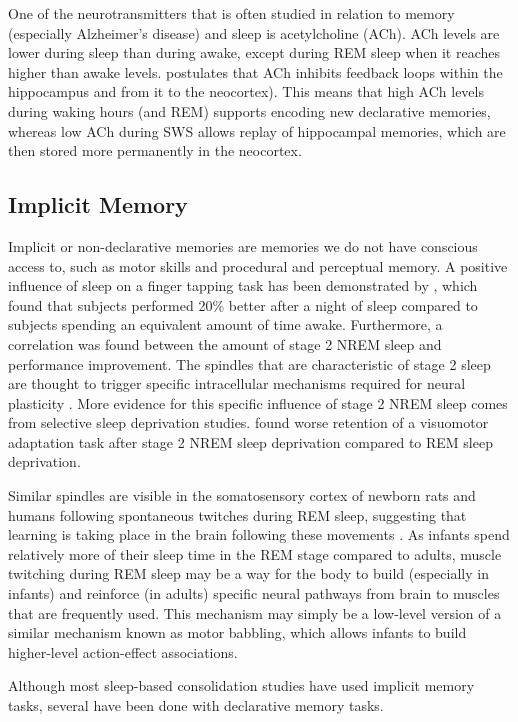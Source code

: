 \documentclass[10pt,letterpaper]{article}
\begin{document}
One of the neurotransmitters that is often studied in relation to memory (especially Alzheimer's disease) and sleep is acetylcholine (ACh). ACh levels are lower during sleep than during awake, except during REM sleep when it reaches higher than awake levels.  postulates that ACh inhibits feedback loops within the hippocampus and from it to the neocortex). This means that high ACh levels during waking hours (and REM) supports encoding new declarative memories, whereas low ACh during SWS allows replay of hippocampal memories, which are then stored more permanently in the neocortex.


\subsection{Implicit Memory}

Implicit or non-declarative memories are memories we do not have conscious access to, such as motor skills and procedural and perceptual memory. A positive influence of sleep on a finger tapping task has been demonstrated by , which found that subjects performed 20\% better after a night of sleep compared to subjects spending an equivalent amount of time awake. Furthermore, a correlation was found between the amount of stage 2 NREM sleep and performance improvement. The spindles that are characteristic of stage 2 sleep are thought to trigger specific intracellular mechanisms required for neural plasticity \cite{Walker:2006}. More evidence for this specific influence of stage 2 NREM sleep comes from selective sleep deprivation studies.  found worse retention of a visuomotor adaptation task after stage 2 NREM sleep deprivation compared to REM sleep deprivation.

Similar spindles are visible in the somatosensory cortex of newborn rats and humans following spontaneous twitches during REM sleep, suggesting that learning is taking place in the brain following these movements \cite{Khazipov:2004}. As infants spend relatively more of their sleep time in the REM stage compared to adults, muscle twitching during REM sleep may be a way for the body to build (especially in infants) and reinforce (in adults) specific neural pathways from brain to muscles that are frequently used. This mechanism may simply be a low-level version of a similar mechanism known as motor babbling, which allows infants to build higher-level action-effect associations.

Although most sleep-based consolidation studies have used implicit memory tasks, several have been done with declarative memory tasks.
\end{document}
